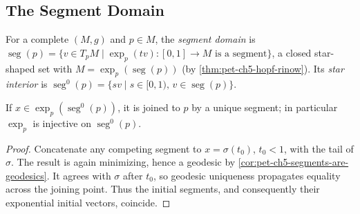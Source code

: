 \subsection{The Segment Domain}

\begin{definition}
  \label{def:pet-ch5-segment-domain}


  For a complete $(M,g)$ and $p\in M$, the \emph{segment domain} is
  $\operatorname{seg}(p)=\{v\in T_pM\mid\exp_p(tv):[0,1]\to M\text{ is a segment}\}$,
  a closed star-shaped set with $M=\exp_p(\operatorname{seg}(p))$ (by
  \cref{thm:pet-ch5-hopf-rinow}). Its \emph{star interior} is
  $\operatorname{seg}^0(p)=\{sv\mid s\in[0,1),\,v\in\operatorname{seg}(p)\}$.
\end{definition}

\begin{proposition}
  \label{prop:pet-ch5-segment-domain-injective}


  If $x\in\exp_p(\operatorname{seg}^0(p))$, it is joined to $p$ by a unique
  segment; in particular $\exp_p$ is injective on $\operatorname{seg}^0(p)$.
\end{proposition}
\begin{proof}

  \sketch
  Concatenate any competing segment to $x=\sigma(t_0)$, $t_0<1$, with the tail of
  $\sigma$.  The result is again minimizing, hence a geodesic by
  \cref{cor:pet-ch5-segments-are-geodesics}.  It agrees with $\sigma$ after $t_0$,
  so geodesic uniqueness propagates equality across the joining point.  Thus the
  initial segments, and consequently their exponential initial vectors, coincide.
\end{proof}

